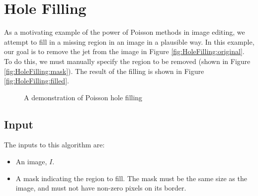 \documentclass{InsightArticle}
\begin{document}
\section{Hole Filling}
As a motivating example of the power of Poisson methods in image editing, we attempt to fill in a missing region in an image in a plausible way. In this example, our goal is to remove the jet from the image in Figure \ref{fig:HoleFilling:original}. To do this, we must manually specify the region to be removed (shown in Figure \ref{fig:HoleFilling:mask}). The result of the filling is shown in Figure \ref{fig:HoleFilling:filled}.

\begin{figure}[H]
\centering
{}
\caption{A demonstration of Poisson hole filling}
\label{fig:HoleFilling}
\end{figure}

\subsection{Input}
The inputs to this algorithm are:
\begin{itemize}
\item An image, $I$.
\item A mask indicating the region to fill. The mask must be the same size as the image, and must not have non-zero pixels on its border.
\end{itemize}
\end{document}
